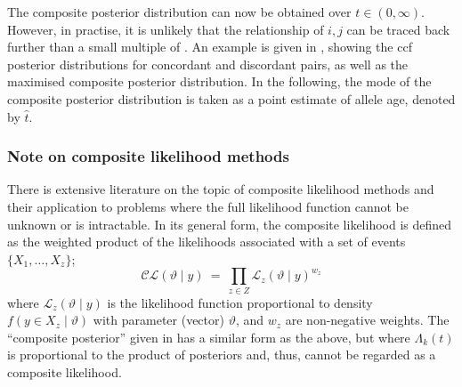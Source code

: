 %

%

The composite posterior distribution can now be obtained over ${t \in (0,\infty)}$.
However, in practise, it is unlikely that the relationship of ${i,j}$ can be traced back further than a small multiple of \Ne.
An example is given in , showing the \gls{ccf} posterior distributions for concordant and discordant pairs, as well as the maximised composite posterior distribution.
In the following, the mode of the composite posterior distribution is taken as a point estimate of allele age, denoted by $\hat{t}$.



%



%
\subsubsection{Note on composite likelihood methods}
%

There is extensive literature on the topic of composite likelihood methods and their application to problems where the full likelihood function cannot be unknown or is intractable.
In its general form, the composite likelihood is defined as the weighted product of the likelihoods associated with a set of events ${\{X_1,\ldots,X_z\}}$; \ie \citep{lindsay1988composite}
\begin{equation}\label{eq:simple_cl}
	\mathcal{C\!L}(\vartheta\mid y)~=~\prod_{z\in Z} \mathcal{L}_z(\vartheta\mid y)^{w_z}
\end{equation}
where ${\mathcal{L}_z(\vartheta\mid y)}$ is the likelihood function proportional to density ${f(y\in X_z \mid \vartheta)}$ with parameter (vector) $\vartheta$, and $w_z$ are non-negative weights.
The ``composite posterior'' given in  has a similar form as the above, but where ${\Lambda_k(t)}$ is proportional to the product of posteriors and, thus, cannot be regarded as a composite likelihood.

